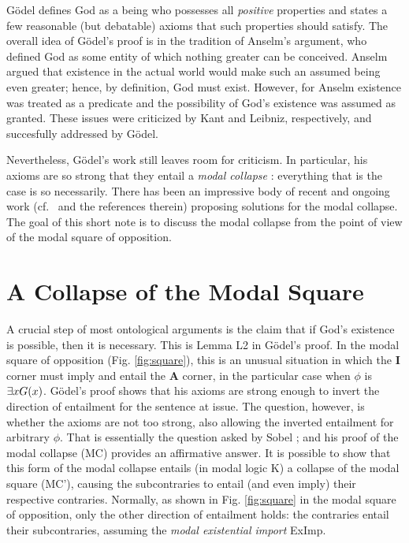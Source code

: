 \documentclass{birkjour}
\theoremstyle{definition}
\theoremstyle{remark}
\numberwithin{equation}{section}
\begin{document}


G\"{o}del defines God as a being who possesses all \emph{positive}
properties and states a few reasonable (but debatable) axioms
that such properties should satisfy.  
The overall idea of G{\"o}del's proof is in the tradition of Anselm's
argument, who defined God as some entity of which nothing greater can be
conceived. Anselm argued that existence in the actual world would
make such an assumed being even greater; hence, by definition, God must
exist. However, for Anselm existence was treated as a predicate and the possibility of God's existence was assumed as granted. These issues were criticized by Kant and Leibniz, respectively, and succesfully addressed by G\"odel. 

Nevertheless, G{\"o}del's work
still leaves room for criticism. In particular, his axioms are so
strong that they entail a \emph{modal collapse} 
\cite{ToDo:sobel1987?,sobel2004logic}: 
everything that is the case is so necessarily. 
There has been an impressive body of recent and ongoing
work (cf.~\cite{sobel2004logic,Fitting,anderson90:_some_emend_of_goedel_ontol_proof,AndersonGettings,ToDo:FrodeAndHajek,ContemporaryBibliography} and the references therein)
proposing solutions for the modal collapse. 
The goal of this short note is to discuss the modal collapse from the point of view of the modal square of opposition.


\section{A Collapse of the Modal Square}

A crucial step of most ontological arguments is the claim that 
if God's existence is possible, then it is necessary. 
This is Lemma L2 in G\"odel's proof. 
In the modal square of opposition (Fig. \ref{fig:square}), 
this is an unusual situation in which the \textbf{I} corner 
must imply and entail the \textbf{A} corner, 
in the particular case when $\phi$ is $\exists x G(x)$. 
G\"odel's proof shows that his axioms are strong enough 
to invert the direction of entailment for the sentence at issue. 
The question, however, is whether the axioms are not too strong, 
also allowing the inverted entailment for arbitrary $\phi$. 
That is essentially the question asked by Sobel \cite{Sobel1987}; 
and his proof of the modal collapse (MC) provides an affirmative 
answer. It is possible to show that this form of the modal 
collapse entails (in modal logic K) a collapse of the modal 
square (MC'), causing the subcontraries to entail (and even imply) their respective contraries. Normally, as shown in Fig. \ref{fig:square} in the modal square of opposition, only the other direction of entailment holds: the contraries entail their subcontraries, assuming the \emph{modal existential import} ExImp.
\end{document}

